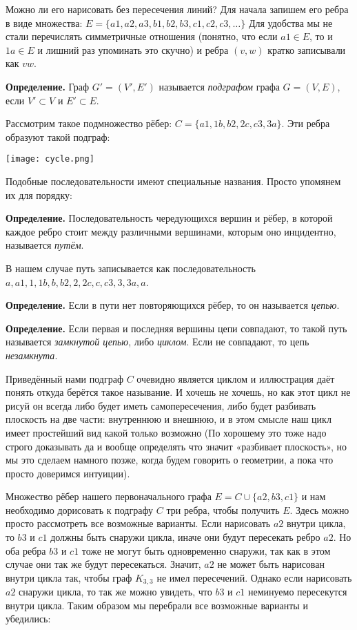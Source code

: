 Можно ли его нарисовать без пересечения линий? Для начала запишем его ребра в виде множества: $E = \{a1, a2, a3, b1, b2, b3, c1, c2, c3, \ldots\}$ Для удобства мы не стали перечислять симметричные отношения (понятно, что если $a1\in E$, то и $1a \in E$ и лишний раз упоминать это скучно) и ребра $(v, w)$ кратко записывали как $vw$.

{\bfseries Определение.} Граф $G' = (V', E')$ называется {\slshape подграфом} графа $G = (V, E)$, если $V' \subset V$ и $E' \subset E$.

Рассмотрим такое подмножество рёбер: $C = \{a1, 1b, b2, 2c, c3, 3a\}$. Эти ребра образуют такой подграф:

\texttt{[image: cycle.png]}

Подобные последовательности имеют специальные названия. Просто упомянем их для порядку:

{\bfseries Определение.} Последовательность чередующихся вершин и рёбер, в которой каждое ребро стоит между различными вершинами, которым оно инцидентно, называется {\slshape путём}.

В нашем случае путь записывается как последовательность $a, a1, 1, 1b, b, b2, 2, 2c, c, c3, 3, 3a, a$.

{\bfseries Определение.} Если в пути нет повторяющихся рёбер, то он называется {\slshape цепью}.

{\bfseries Определение.} Если первая и последняя вершины цепи совпадают, то такой путь называется {\slshape замкнутой цепью}, либо {\slshape циклом}. Если не совпадают, то цепь {\slshape незамкнута}.

Приведённый нами подграф $C$ очевидно является циклом и иллюстрация даёт понять откуда берётся такое называние. И хочешь не хочешь, но как этот цикл не рисуй он всегда либо будет иметь самопересечения, либо будет разбивать плоскость на две части: внутреннюю и внешнюю, и в этом смысле наш цикл имеет простейший вид какой только возможно (По хорошему это тоже надо строго доказывать да и вообще определять что значит «разбивает плоскость», но мы это сделаем намного позже, когда будем говорить о геометрии, а пока что просто доверимся интуиции).

Множество рёбер нашего первоначального графа $E = C \cup \{a2, b3, c1\}$ и нам необходимо дорисовать к подграфу $C$ три ребра, чтобы получить $E$. Здесь можно просто рассмотреть все возможные варианты. Если нарисовать $a2$ внутри цикла, то $b3$ и $c 1$ должны быть снаружи цикла, иначе они будут пересекать ребро $a2$. Но оба ребра $b3$ и $c 1$ тоже не могут быть одновременно снаружи, так как в этом случае они так же будут пересекаться. Значит, $a2$ не может быть нарисован внутри цикла так, чтобы граф $K_{3, 3}$ не имел пересечений. Однако если нарисовать $a2$ снаружи цикла, то так же можно увидеть, что $b3$ и $c 1$ неминуемо пересекутся внутри цикла. Таким образом мы перебрали все возможные варианты и убедились:

